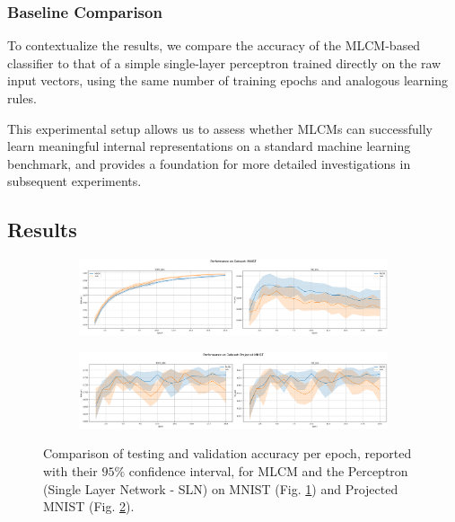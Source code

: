 \documentclass[a4paper,12pt]{report}
\begin{document}
\subsubsection*{Baseline Comparison}
To contextualize the results, we compare the accuracy of the MLCM-based classifier 
to that of a simple single-layer perceptron trained directly on the raw input vectors, 
using the same number of training epochs and analogous learning rules.
\vspace{0.5em}

This experimental setup allows us to assess whether MLCMs can successfully learn 
meaningful internal representations on a standard machine learning benchmark, and 
provides a foundation for more detailed investigations in subsequent experiments.
\subsection{Results}
\newcommand{\experimentlength}{1}
\begin{figure}[h!]
    \centering
    \begin{subfigure}{\experimentlength\textwidth}
        \includegraphics[width=\linewidth]{pictures/mnist_exp1.png}
        \caption{}\label{fig:mnist_exp1}
    \end{subfigure}
    \hfill
    \begin{subfigure}{\experimentlength\textwidth}
        \includegraphics[width=\linewidth]{pictures/projected_mnist_exp1.png}
        \caption{}\label{fig:emnist_exp1}
    \end{subfigure}
    \caption{Comparison of testing and validation accuracy per epoch, reported with 
    their $95\%$ confidence interval, for MLCM and the Perceptron (Single Layer 
    Network  - SLN) on MNIST (Fig. \ref{fig:mnist_exp1}) and Projected MNIST 
    (Fig. \ref{fig:emnist_exp1}).}
    \label{fig:all_mnist_exp1}
\end{figure}
\end{document}
